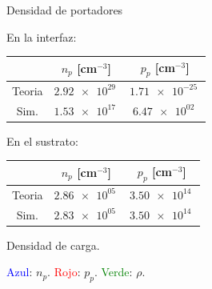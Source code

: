 \documentclass{/home/daniel/GitHub/USC-Physics-Degree-Notes/Notes/Presentacion}
\begin{document}
\begin{frame}{Densidad de portadores}
    \begin{minipage}{0.4\linewidth}
        \begin{center}
            \small
            En la interfaz: 
            \vspace*{1em}
            \begin{tabular}{ccc}
                \toprule
                & $n_p $ [cm$^{-3}$] & $p_p $ [cm$^{-3}$]  \\ \midrule
                Teoria &$\SI{2.92e+29}{}$& $\SI{1.71e-25}{}$ \\
                Sim. & $\SI{1.53e+17}{}$ & $\SI{6.47e+02}{}$ \\
                \bottomrule
            \end{tabular}

            \vspace*{2em}

            En el sustrato: 

            \vspace*{1em}


            \begin{tabular}{ccc}
                \toprule
                & $n_p $ [cm$^{-3}$] & $p_p $ [cm$^{-3}$]  \\ \midrule
                Teoria & $\SI{2.86e+05}{}$ & $\SI{3.50e+14}{}$ \\
                Sim. & $\SI{2.83e+05}{}$ & $\SI{3.50e+14}{}$ \\
                \bottomrule
            \end{tabular}

        \end{center}
    \end{minipage}
    \hfill
    \begin{minipage}{0.55\linewidth}\centering

        Densidad de carga.

        \vspace*{0.5em}

        \textcolor{blue}{Azul}: $n_p$. \textcolor{red}{Rojo}: $p_p$. \textcolor{Green}{Verde}: $\rho$.  

        \vspace*{1em}


\end{minipage}
\end{frame}
\end{document}
